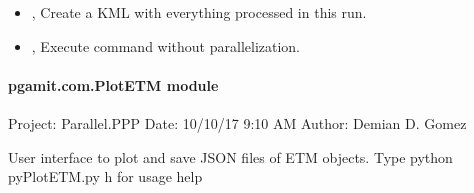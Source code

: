 \documentclass[letterpaper,10pt,english]{sphinxmanual}
\begin{document}
\begin{itemize}
\item {} 
\sphinxAtStartPar
{\hyperref[\detokenize{pgamit.com:ParallelGamit.py--kml}]{}}, {\hyperref[\detokenize{pgamit.com:ParallelGamit.py---create_kml}]{}} \sphinxhyphen{} Create a KML with everything processed in this run.

\item {} 
\sphinxAtStartPar
{\hyperref[\detokenize{pgamit.com:ParallelGamit.py--np}]{}}, {\hyperref[\detokenize{pgamit.com:ParallelGamit.py---noparallel}]{}} \sphinxhyphen{} Execute command without parallelization.

\end{itemize}


\paragraph{pgamit.com.PlotETM module}
\label{\detokenize{pgamit.com:module-pgamit.com.PlotETM}}\label{\detokenize{pgamit.com:pgamit-com-plotetm-module}}
\sphinxAtStartPar
Project: Parallel.PPP
Date: 10/10/17 9:10 AM
Author: Demian D. Gomez

\sphinxAtStartPar
User interface to plot and save JSON files of ETM objects.
Type python pyPlotETM.py \sphinxhyphen{}h for usage help

\begin{fulllineitems}
\label{\detokenize{pgamit.com:pgamit.com.PlotETM.from_file}}
\pysigstartsignatures
\pysiglinewithargsret
{}
{\sphinxparamcomma {}\sphinxparamcomma {}}
{}
\pysigstopsignatures
\end{fulllineitems}

\end{document}
